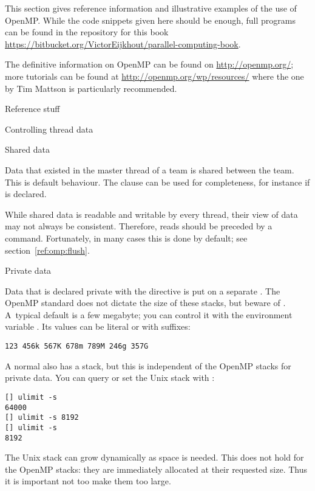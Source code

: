 
This section gives reference information and illustrative examples
of the use of OpenMP. While the code snippets given here should be enough,
full programs can be found in the repository for this book
\url{https://bitbucket.org/VictorEijkhout/parallel-computing-book}.

The definitive information on OpenMP can be found on
\url{http://openmp.org/}; more tutorials can be found at
\url{http://openmp.org/wp/resources/} where the one
by Tim Mattson is particularly recommended.

 {Reference stuff}

 {Controlling thread data}

 {Shared data}

Data that existed in the master thread of a team
is shared between the team. This is default behaviour.
The clause  can be used for completeness,
for instance if  is declared.

While shared data is readable and writable by every thread, their view
of data may not always be consistent. Therefore, reads should be
preceded by a  command.  Fortunately, in many cases
this is done by default; see section~\ref{ref:omp:flush}.

 {Private data}
\label{sec:ref:omp-private}

Data that is declared private with the  directive is
put on a separate . The OpenMP standard
does not dictate the size of these stacks, but beware of .
A~typical default
is a few megabyte; you can control it with the environment variable
. Its values can be literal or with suffixes:
\begin{verbatim}
123 456k 567K 678m 789M 246g 357G
\end{verbatim}

A normal  also has a stack, but this is
independent of the OpenMP stacks for private data. You can query or
set the Unix stack with :
\begin{verbatim}
[] ulimit -s
64000
[] ulimit -s 8192
[] ulimit -s
8192
\end{verbatim}
The Unix stack can grow dynamically as space is needed. This does not
hold for the OpenMP stacks: they are immediately allocated at their
requested size. Thus it is important not too make them too large.

